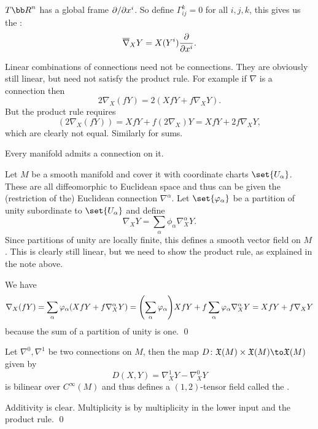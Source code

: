 \eproof

\bexam

    $T\bR^n$ has a global frame $\partial /\partial x^i$.
    So define $\Gamma^k_{ij}=0$ for all $i,j,k$, this gives us the :
    $$ \overline\nabla_XY = X(Y^i){{\partial }\over{\partial x^i}} . $$

\eexam

\bnote

    Linear combinations of connections need not be connections.
    They are obviously still linear, but need not satisfy the product rule.
    For example if $\nabla$ is a connection then
    $$ 2\nabla_X(fY) = 2(XfY + f\nabla_XY) . $$
    But the product rule requires
    $$ (2\nabla_X(fY)) = XfY + f(2\nabla_X)Y = XfY + 2f\nabla_XY , $$
    which are clearly not equal.
    Similarly for sums.

\enote

\bprop

    Every manifold admits a connection on it.

\eprop

\bproof

    Let $M$ be a smooth manifold and cover it with coordinate charts $\set{U_\alpha}$.
    These are all diffeomorphic to Euclidean space and thus can be given the (restriction of the) Euclidean connection
    $\nabla^\alpha$.
    Let $\set{\phi_\alpha}$ be a partition of unity subordinate to $\set{U_\alpha}$ and define
    $$ \nabla_XY = \sum_\alpha\phi_\alpha\nabla^\alpha_XY . $$
    Since partitions of unity are locally finite, this defines a smooth vector field on $M$.
    This is clearly still linear, but we need to show the product rule, as explained in the note above.

    We have
    $$ \nabla_X(fY) = \sum_\alpha\varphi_\alpha(XfY + f\nabla^\alpha_XY) = \mathopen{}\mathclose{\left(\sum_\alpha\varphi_\alpha\right)}XfY
    + f\sum_\alpha\varphi_\alpha\nabla^\alpha_XY = XfY + f\nabla_XY $$
    because the sum of a partition of unity is one.
    \qed

\eproof

\bprop

    Let $\nabla^0,\nabla^1$ be two connections on $M$, then the map $D\colon\X(M)\times\X(M)\to\X(M)$ given by
    $$ D(X,Y) = \nabla^1_XY - \nabla^0_XY $$
    is bilinear over $C^\infty(M)$ and thus defines a $(1,2)$-tensor field called the .

\eprop

\bproof

    Additivity is clear.
    Multiplicity is by multiplicity in the lower input and the product rule.
    \qed

